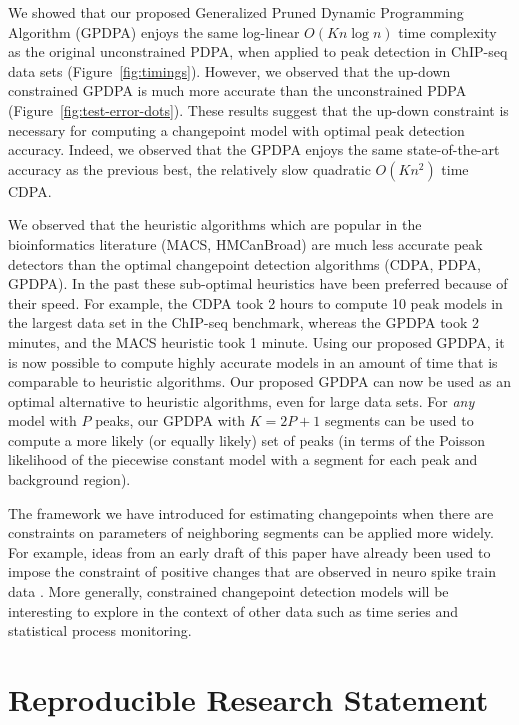 \documentclass[twoside,11pt]{article}
\begin{document}
We showed that our proposed Generalized Pruned Dynamic Programming
Algorithm (GPDPA) enjoys the same log-linear $O(Kn\log n)$ time
complexity as the original unconstrained PDPA, when applied to peak
detection in ChIP-seq data sets (Figure~\ref{fig:timings}). However,
we observed that the up-down constrained GPDPA is much more accurate
than the unconstrained PDPA (Figure~\ref{fig:test-error-dots}). These
results suggest that the up-down constraint is necessary for computing
a changepoint model with optimal peak detection accuracy. Indeed, we
observed that the GPDPA enjoys the same state-of-the-art accuracy as
the previous best, the relatively slow quadratic $O(Kn^2)$ time
CDPA.

We observed that the heuristic algorithms which are popular in the
bioinformatics literature (MACS, HMCanBroad) are much less accurate peak detectors
than the optimal changepoint detection algorithms (CDPA, PDPA,
GPDPA). In the past these sub-optimal heuristics have been preferred
because of their speed. For example, the CDPA took 2 hours to compute
10 peak models in the largest data set in the ChIP-seq benchmark,
whereas the GPDPA took 2 minutes, and the MACS heuristic took 1
minute. Using our proposed GPDPA, it is now possible to compute highly
accurate models in an amount of time that is comparable to heuristic
algorithms. Our proposed GPDPA can now be used as an optimal
alternative to heuristic algorithms, even for large data sets. 
For \emph{any} model with $P$ peaks, our GPDPA with $K=2P+1$ segments can be used to compute 
a more likely (or equally likely) set of peaks (in terms of the Poisson likelihood 
of the piecewise constant model with a segment for each peak and background region).

The framework we have introduced for estimating changepoints when
there are constraints on parameters of neighboring segments can be
applied more widely. For example, ideas from an early draft of this
paper \citep{Hocking-constrained-changepoint-detection} have already
been used to impose the constraint of positive changes that are
observed in neuro spike train data \citep{Jewell2018}. More generally,
constrained changepoint detection models will be interesting to
explore in the context of other data such as time series and
statistical process monitoring.
 
\section{Reproducible Research Statement}
\end{document}
